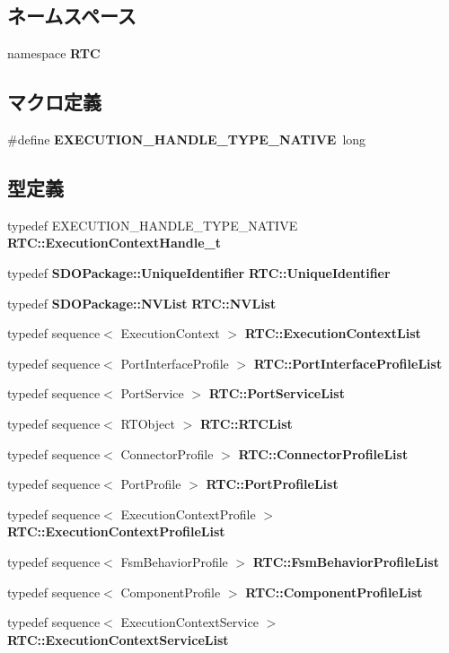 \subsection*{ネームスペース}
\begin{DoxyCompactItemize}
\item 
namespace {\bf RTC}
\end{DoxyCompactItemize}
\subsection*{マクロ定義}
\begin{DoxyCompactItemize}
\item 
\#define {\bf EXECUTION\_\-HANDLE\_\-TYPE\_\-NATIVE}~long
\end{DoxyCompactItemize}
\subsection*{型定義}
\begin{DoxyCompactItemize}
\item 
typedef EXECUTION\_\-HANDLE\_\-TYPE\_\-NATIVE {\bf RTC::ExecutionContextHandle\_\-t}
\item 
typedef {\bf SDOPackage::UniqueIdentifier} {\bf RTC::UniqueIdentifier}
\item 
typedef {\bf SDOPackage::NVList} {\bf RTC::NVList}
\item 
typedef sequence$<$ ExecutionContext $>$ {\bf RTC::ExecutionContextList}
\item 
typedef sequence$<$ PortInterfaceProfile $>$ {\bf RTC::PortInterfaceProfileList}
\item 
typedef sequence$<$ PortService $>$ {\bf RTC::PortServiceList}
\item 
typedef sequence$<$ RTObject $>$ {\bf RTC::RTCList}
\item 
typedef sequence$<$ ConnectorProfile $>$ {\bf RTC::ConnectorProfileList}
\item 
typedef sequence$<$ PortProfile $>$ {\bf RTC::PortProfileList}
\item 
typedef sequence$<$ ExecutionContextProfile $>$ {\bf RTC::ExecutionContextProfileList}
\item 
typedef sequence$<$ FsmBehaviorProfile $>$ {\bf RTC::FsmBehaviorProfileList}
\item 
typedef sequence$<$ ComponentProfile $>$ {\bf RTC::ComponentProfileList}
\item 
typedef sequence$<$ ExecutionContextService $>$ {\bf RTC::ExecutionContextServiceList}
\end{DoxyCompactItemize}
